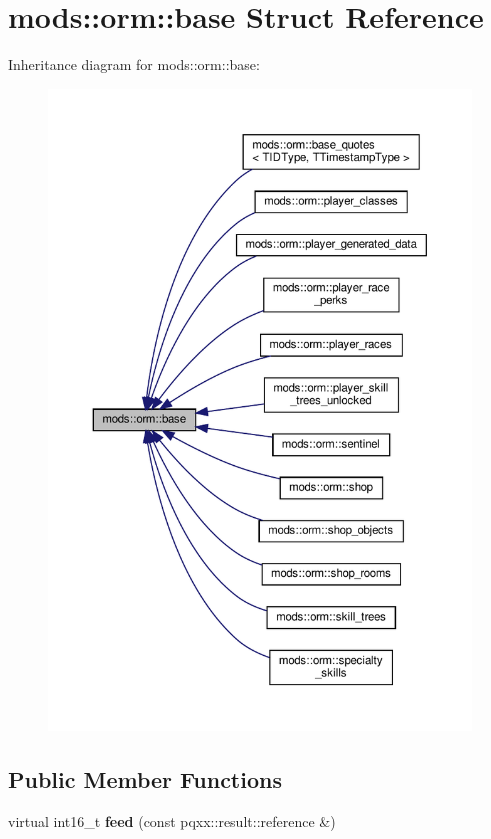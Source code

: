 \hypertarget{structmods_1_1orm_1_1base}{}\section{mods\+:\+:orm\+:\+:base Struct Reference}
\label{structmods_1_1orm_1_1base}


Inheritance diagram for mods\+:\+:orm\+:\+:base\+:
\nopagebreak
\begin{figure}[H]
\begin{center}
\leavevmode
\includegraphics[width=350pt]{structmods_1_1orm_1_1base__inherit__graph}
\end{center}
\end{figure}
\subsection*{Public Member Functions}
\begin{DoxyCompactItemize}
\item 
\mbox{\label{structmods_1_1orm_1_1base_a664fca1958049edfb203ec8993cf81bd}} 
virtual int16\+\_\+t {\bfseries feed} (const pqxx\+::result\+::reference \&)
\end{DoxyCompactItemize}
